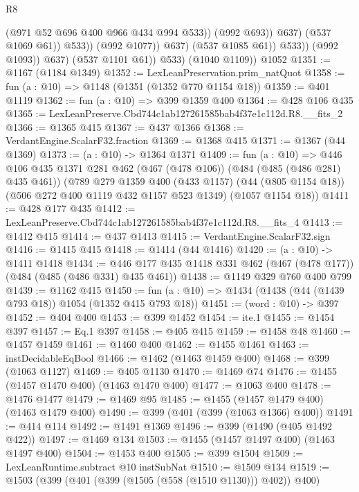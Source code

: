 \begin{lexlean}{R8}
\begin{coremodule}
                                    (@971 @52 @696 @400 @966 @434 @994 @533))
                                  (@992 @693))
                                @637)
                              (@537 @1069 @61))
                            @533))
                        (@992 @1077))
                      @637)
                    (@537 @1085 @61))
                  @533))
              (@992 @1093))
            @637)
          (@537 @1101 @61))
        @533)
      (@1040 @1109))
    @1052
@1351 := @1167 (@1184 @1349)
@1352 := LexLeanPreservation.prim_natQuot
@1358 := fun (a : @10) => @1148 (@1351 (@1352 @770 @1154 @18))
@1359 := @401 @1119
@1362 := fun (a : @10) => @399 @1359 @400
@1364 := @428 @106 @435
@1365 := LexLeanPreserve.Cbd744c1ab127261585bab4f37e1c112d.R8.__fits_2
@1366 := @1365 @415
@1367 := @437 @1366
@1368 := VerdantEngine.ScalarF32.fraction
@1369 := @1368 @415
@1371 := @1367 (@44 @1369)
@1373 := (a : @10) -> @1364 @1371
@1409 := fun (a : @10) =>
  @446
    @106
    @435
    @1371
    @281
    @462
    (@467 (@478 @106))
    (@484 (@485 (@486 @281) @435 @461))
    (@789
      @279
      @1359
      @400
      (@433 @1157)
      (@44 (@805 @1154 @18))
      (@506 @272 @400 @1119 @432 @1157 @523 @1349)
      (@1057 @1154 @18))
@1411 := @428 @177 @435
@1412 := LexLeanPreserve.Cbd744c1ab127261585bab4f37e1c112d.R8.__fits_4
@1413 := @1412 @415
@1414 := @437 @1413
@1415 := VerdantEngine.ScalarF32.sign
@1416 := @1415 @415
@1418 := @1414 (@44 @1416)
@1420 := (a : @10) -> @1411 @1418
@1434 := @446 @177 @435 @1418 @331 @462 (@467 (@478 @177)) (@484 (@485 (@486 @331) @435 @461))
@1438 := @1149 @329 @760 @400 @799
@1439 := @1162 @415
@1450 := fun (a : @10) => @1434 (@1438 (@44 (@1439 @793 @18)) @1054 (@1352 @415 @793 @18))
@1451 := (word : @10) -> @397
@1452 := @404 @400
@1453 := @399 @1452
@1454 := ite.{1}
@1455 := @1454 @397
@1457 := Eq.{1} @397
@1458 := @405 @415
@1459 := @1458 @48
@1460 := @1457 @1459
@1461 := @1460 @400
@1462 := @1455 @1461
@1463 := instDecidableEqBool
@1466 := @1462 (@1463 @1459 @400)
@1468 := @399 (@1063 @1127)
@1469 := @405 @1130
@1470 := @1469 @74
@1476 := @1455 (@1457 @1470 @400) (@1463 @1470 @400)
@1477 := @1063 @400
@1478 := @1476 @1477
@1479 := @1469 @95
@1485 := @1455 (@1457 @1479 @400) (@1463 @1479 @400)
@1490 := @399 (@401 (@399 (@1063 @1366) @400))
@1491 := @414 @114
@1492 := @1491 @1369
@1496 := @399 (@1490 (@405 @1492 @422))
@1497 := @1469 @134
@1503 := @1455 (@1457 @1497 @400) (@1463 @1497 @400)
@1504 := @1453 @400
@1505 := @399 @1504
@1509 := LexLeanRuntime.subtract @10 instSubNat
@1510 := @1509 @134
@1519 := @1503 (@399 (@401 (@399 (@1505 (@558 (@1510 @1130))) @402)) @400)

\end{coremodule}
\end{lexlean}
